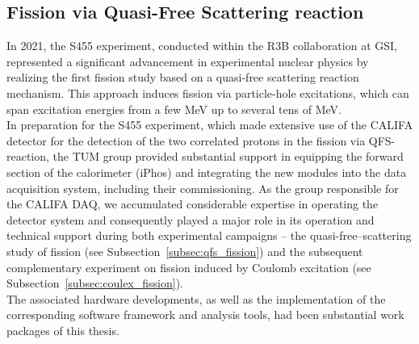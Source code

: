\subsection{Fission via Quasi-Free Scattering reaction}\label{sec:fission_qfs}

In 2021, the S455 experiment, conducted within the R3B collaboration at GSI, represented a significant advancement in experimental nuclear physics by realizing the first fission study based on a quasi-free scattering reaction mechanism. This approach induces fission via particle-hole excitations, which can span excitation energies from a few MeV up to several tens of MeV.\\[1em]
In preparation for the S455 experiment, which made extensive use of the CALIFA detector for the detection of the two correlated protons in the fission via QFS-reaction, the TUM group provided substantial support in equipping the forward section of the calorimeter (iPhos) and integrating the new modules into the data acquisition system, including their commissioning. As the group responsible for the CALIFA DAQ, we accumulated considerable expertise in operating the detector system and consequently played a major role in its operation and technical support during both experimental campaigns -- the quasi-free–scattering study of fission (see Subsection~\ref{subsec:qfs_fission}) and the subsequent complementary experiment on fission induced by Coulomb excitation (see Subsection~\ref{subsec:coulex_fission}).\\
The associated hardware developments, as well as the implementation of the corresponding software framework and analysis tools, had been substantial work packages of this thesis.


